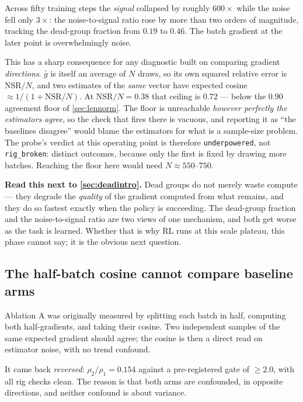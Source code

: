 \documentclass[11pt,letterpaper]{article}
\theoremstyle{definition}
\begin{document}
Across fifty training steps the \emph{signal} collapsed by roughly $600\times$ while the noise fell
only $3\times$: the noise-to-signal ratio rose by more than two orders of magnitude, tracking the
dead-group fraction from $0.19$ to $0.46$. The batch gradient at the later point is overwhelmingly
noise.

This has a sharp consequence for any diagnostic built on comparing gradient \emph{directions}.
$\bar{g}$ is itself an average of $N$ draws, so its own squared relative error is $\mathrm{NSR}/N$,
and two estimates of the \emph{same} vector have expected cosine $\approx 1/(1 + \mathrm{NSR}/N)$.
At $\mathrm{NSR}/N = 0.38$ that ceiling is $0.72$ --- below the $0.90$ agreement floor of
\cref{sec:lennorm}. The floor is unreachable \emph{however perfectly the estimators agree}, so the
check that fires there is vacuous, and reporting it as ``the baselines disagree'' would blame the
estimators for what is a sample-size problem. The probe's verdict at this operating point is
therefore \texttt{underpowered}, not \texttt{rig\_broken}: distinct outcomes, because only the first
is fixed by drawing more batches. Reaching the floor here would need $N \approx 550$--$750$.

\begin{aside}
\textbf{Read this next to \cref{sec:deadintro}.} Dead groups do not merely waste compute --- they
degrade the \emph{quality} of the gradient computed from what remains, and they do so fastest exactly
when the policy is succeeding. The dead-group fraction and the noise-to-signal ratio are two views of
one mechanism, and both get worse as the task is learned. Whether that is why RL runs at this scale
plateau, this phase cannot say; it is the obvious next question.
\end{aside}

\subsection{The half-batch cosine cannot compare baseline arms}
\label{sec:cosine}

Ablation A was originally measured by splitting each batch in half, computing both half-gradients, and
taking their cosine. Two independent samples of the same expected gradient should agree; the cosine
is then a direct read on estimator noise, with no trend confound.

It came back \emph{reversed}: $\rho_2/\rho_1 = 0.154$ against a pre-registered gate of $\ge 2.0$, with
all rig checks clean. The reason is that both arms are confounded, in opposite directions, and neither
confound is about variance.
\end{document}
